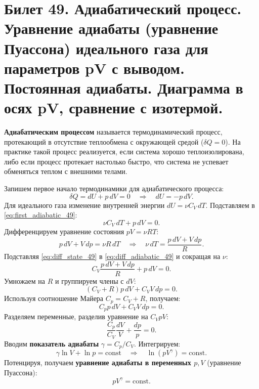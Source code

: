 \section{Билет 49. Адиабатический процесс. Уравнение адиабаты (уравнение Пуассона) идеального газа для параметров pV с выводом. Постоянная адиабаты. Диаграмма в осях pV, сравнение с изотермой.}

\begin{definition}
\textbf{Адиабатическим процессом} называется термодинамический процесс, протекающий в отсутствие теплообмена с окружающей средой ($\delta Q = 0$). На практике такой процесс реализуется, если система хорошо теплоизолирована, либо если процесс протекает настолько быстро, что система не успевает обменяться теплом с внешними телами.
\end{definition}

\begin{theorem}
Запишем первое начало термодинамики для адиабатического процесса:
\begin{equation}
    \delta Q = dU + p \, dV = 0 \quad \Rightarrow \quad dU = -p \, dV. \label{eq:first_adiabatic_49}
\end{equation}
Для идеального газа изменение внутренней энергии $dU = \nu C_V \, dT$. Подставляем в \eqref{eq:first_adiabatic_49}:
\begin{equation}
    \nu C_V \, dT + p \, dV = 0. \label{eq:diff_adiabatic_49}
\end{equation}
Дифференцируем уравнение состояния $pV = \nu RT$:
\begin{equation}
    p \, dV + V \, dp = \nu R \, dT \quad \Rightarrow \quad \nu \, dT = \frac{p \, dV + V \, dp}{R}. \label{eq:diff_state_49}
\end{equation}
Подставляя \eqref{eq:diff_state_49} в \eqref{eq:diff_adiabatic_49} и сокращая на $\nu$:
\begin{equation}
    C_V \frac{p \, dV + V \, dp}{R} + p \, dV = 0.
\end{equation}
Умножаем на $R$ и группируем члены с $dV$:
\begin{equation}
    (C_V + R) p \, dV + C_V V \, dp = 0.
\end{equation}
Используя соотношение Майера $C_p = C_V + R$, получаем:
\begin{equation}
    C_p p \, dV + C_V V \, dp = 0.
\end{equation}
Разделяем переменные, разделив уравнение на $C_V p V$:
\begin{equation}
    \frac{C_p}{C_V} \frac{dV}{V} + \frac{dp}{p} = 0.
\end{equation}
Вводим \textbf{показатель адиабаты} $\gamma = C_p/C_V$. Интегрируем:
\begin{equation}
    \gamma \ln V + \ln p = \text{const} \quad \Rightarrow \quad \ln(p V^\gamma) = \text{const}.
\end{equation}
Потенцируя, получаем \textbf{уравнение адиабаты в переменных $p, V$} (уравнение Пуассона):
\begin{equation}
    p V^\gamma = \text{const}. \label{eq:poisson_49}
\end{equation}
\end{theorem}

